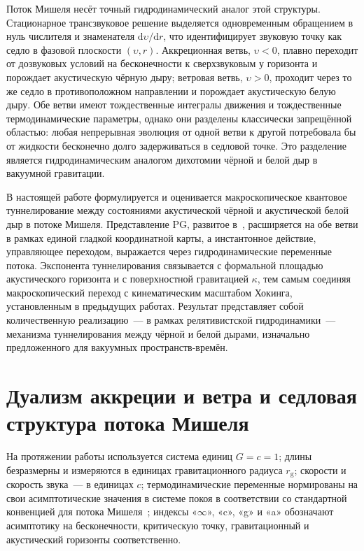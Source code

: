 \documentclass[12pt,a4paper,preprint]{elsarticle}
\begin{document}
        Поток Мишеля несёт точный гидродинамический аналог этой структуры. Стационарное трансзвуковое решение выделяется одновременным обращением в нуль числителя и знаменателя $\mathrm{d}\upsilon/\mathrm{d}r$, что идентифицирует звуковую точку как седло в фазовой плоскости $(\upsilon, r)$. Аккреционная ветвь, $\upsilon < 0$, плавно переходит от дозвуковых условий на бесконечности к сверхзвуковым у горизонта и порождает акустическую чёрную дыру; ветровая ветвь, $\upsilon > 0$, проходит через то же седло в противоположном направлении и порождает акустическую белую дыру. Обе ветви имеют тождественные интегралы движения и тождественные термодинамические параметры, однако они разделены классически запрещённой областью: любая непрерывная эволюция от одной ветви к другой потребовала бы от жидкости бесконечно долго задерживаться в седловой точке. Это разделение является гидродинамическим аналогом дихотомии чёрной и белой дыр в вакуумной гравитации.
        
        В настоящей работе формулируется и оценивается макроскопическое квантовое туннелирование между состояниями акустической чёрной и акустической белой дыр в потоке Мишеля. Представление PG, развитое в~\cite{SemyannikovAV_GlobalAcousticGeometryOfMichelFlowInPainleveGullstrandCoordinates_2026}, расширяется на обе ветви в рамках единой гладкой координатной карты, а инстантонное действие, управляющее переходом, выражается через гидродинамические переменные потока. Экспонента туннелирования связывается с формальной площадью акустического горизонта и с поверхностной гравитацией $\kappa$, тем самым соединяя макроскопический переход с кинематическим масштабом Хокинга, установленным в предыдущих работах. Результат представляет собой количественную реализацию~--- в рамках релятивистской гидродинамики~--- механизма туннелирования между чёрной и белой дырами, изначально предложенного для вакуумных пространств-времён.

    \section{Дуализм аккреции и ветра и седловая структура потока Мишеля}\label{sec:duality}
        На протяжении работы используется система единиц $G = c = 1$; длины безразмерны и измеряются в единицах гравитационного радиуса $r_{\mathrm{g}}$; скорости и скорость звука~--- в единицах $c$; термодинамические переменные нормированы на свои асимптотические значения в системе покоя в соответствии со стандартной конвенцией для потока Мишеля~\cite{MichelFC_AccretionOfMatterByCondensedObjects_1972, MoncriefV_StabilityOfStationarySphericalAccretionOntoASchwarzschildBlackHole_1980}; индексы «$\infty$», «c», «g» и «a» обозначают асимптотику на бесконечности, критическую точку, гравитационный и акустический горизонты соответственно.
        
\end{document}
